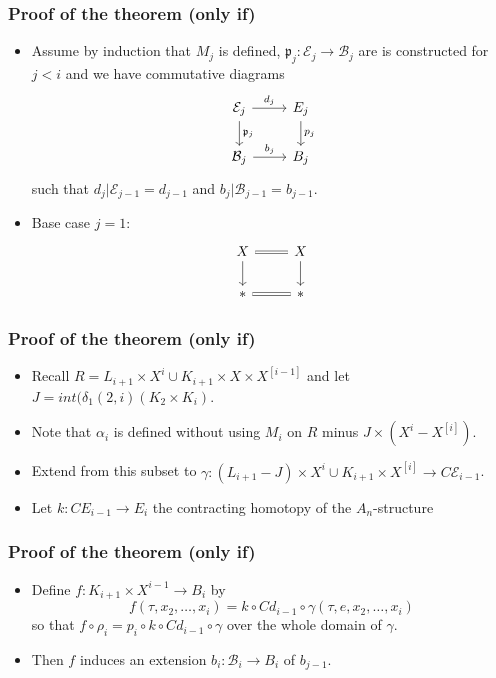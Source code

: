 \documentclass{beamer}
\theoremstyle{definition}
\begin{document}
\begin{frame}[fragile]
\frametitle{Proof of the theorem (only if)}
\begin{itemize}
\item<1-> Assume by induction that $M_j$ is defined, $\mathfrak{p}_j:\mathcal{E}_j\to\mathcal{B}_j$ are is constructed for $j<i$ and we have commutative diagrams
\[
\begin{tikzcd}
\mathcal{E}_j\arrow[r,"d_j"]\arrow[d,"\mathfrak{p}_j"]& E_j\arrow[d,"p_j"]\\
\mathcal{B}_j\arrow[r,"b_j"]&B_j
\end{tikzcd}
\]
such that $d_j|\mathcal{E}_{j-1}=d_{j-1}$ and $b_j|\mathcal{B}_{j-1}=b_{j-1}$. %
\item<2-> Base case $j=1$:
\[
\begin{tikzcd}
 X\arrow[r,equals]\arrow[d]& X\arrow[d]\\
* \arrow[r,equals]        & *
\end{tikzcd}
\]
\end{itemize}
\end{frame}
\begin{frame}
\frametitle{Proof of the theorem (only if)}
\begin{itemize}


 \item<1-> Recall $R=L_{i+1}\times X^i\cup K_{i+1}\times X\times X^{[i-1]}$ and let $J=int(\delta_1(2,i)(K_2\times K_i)$. 
 \item<2-> Note that $\alpha_i$ is defined without using $M_i$ on $R$ minus $J\times(X^i-X^{[i]})$.
 \item<3-> Extend from this subset to $\gamma:(L_{i+1}-J)\times X^i\cup K_{i+1}\times X^{[i]}\to C\mathcal{E}_{i-1}$.
 \item<4-> Let $k:CE_{i-1}\to E_i$ the contracting homotopy of the $A_n$-structure %

 \end{itemize}
\end{frame}
\begin{frame}
\frametitle{Proof of the theorem (only if)}
\begin{itemize}
 \item<1-> Define $f:K_{i+1}\times X^{i-1}\to B_i$ by \[f(\tau,x_2,\dots,x_i)=k\circ Cd_{i-1}\circ\gamma(\tau,e,x_2,\dots,x_i)\] so that $f\circ\rho_i=p_i\circ k\circ Cd_{i-1}\circ\gamma$ over the whole domain of $\gamma$. %
 \item<2-> Then $f$ induces an extension $b_i:\mathcal{B}_i\to B_i$ of $b_{j-1}$. %

\end{itemize}
\end{frame}
\end{document}
